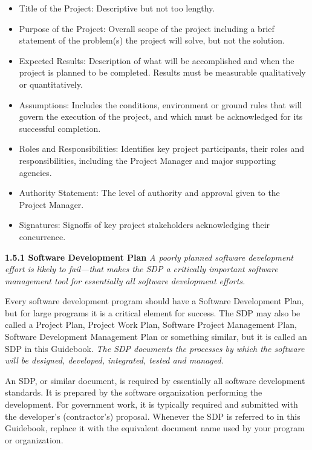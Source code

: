 \documentclass{book}
\begin{document}
\begin{multicols}{2}
\begin{itemize}
\item Title of the Project: Descriptive but not too lengthy.
\item Purpose of the Project: Overall scope of the project
including a brief statement of the problem(s) the project will solve, but not the solution.
\item Expected Results: Description of what will be accomplished and when the project is planned to be completed. Results must be measurable qualitatively or
quantitatively.
\item Assumptions: Includes the conditions, environment or
ground rules that will govern the execution of the project, and which must be acknowledged for its successful
completion.
\item Roles and Responsibilities: Identifies key project participants, their roles and responsibilities, including the
Project Manager and major supporting agencies.
\item Authority Statement: The level of authority and approval
given to the Project Manager.
\item Signatures: Signoffs of key project stakeholders
acknowledging their concurrence.

\end{itemize}

\textbf{1.5.1 Software Development Plan}
\textit{
A poorly planned software development effort
is likely to fail—that makes the SDP a critically
important software management tool for essentially
all software development efforts.}



Every software development program should have a
Software Development Plan, but for large programs it is a critical element for success. The SDP may also be called a Project
Plan, Project Work Plan, Software Project Management Plan,
Software Development Management Plan or something similar,
but it is called an SDP in this Guidebook. \textit{The SDP documents
the processes by which the software will be designed, developed,
integrated, tested and managed.}

An SDP, or similar document, is required by essentially
all software development standards. It is prepared by the
software organization performing the development. For government work, it is typically required and submitted with
the developer’s (contractor’s) proposal. Whenever the SDP is
referred to in this Guidebook, replace it with the equivalent
document name used by your program or organization.


\end{multicols}
\end{document}

